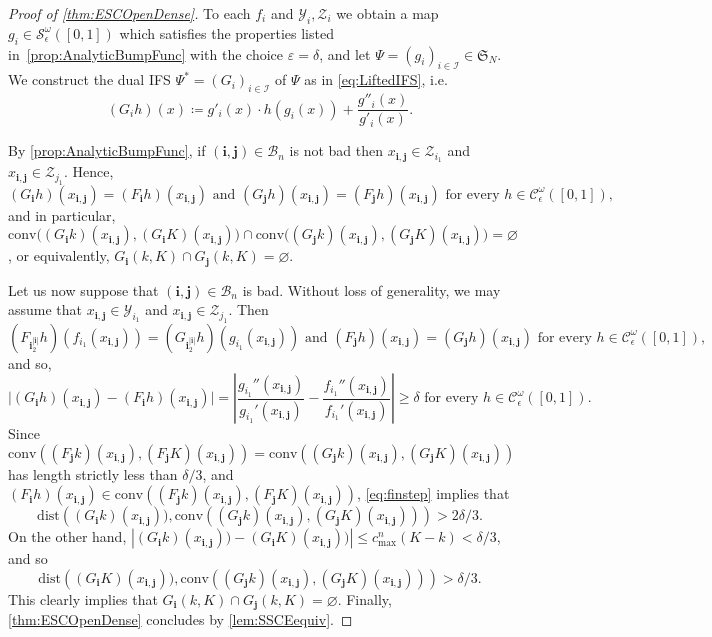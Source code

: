 \documentclass[12pt,]{article}
\def\cref#1{\ref{#1}}%
\theoremstyle{definition}
\theoremstyle{remark}
\newcommand{\0}{\mathbf{0}}
\newcommand{\bi}{\mathbf{i}}
\newcommand{\bj}{\mathbf{j}}
\begin{document}
\begin{proof}[Proof of \cref{thm:ESCOpenDense}]
To each $f_i$ and $\mathcal{Y}_i, \mathcal{Z}_i$ we obtain a map $g_i\in\mathcal{S}_\epsilon^\omega([0,1])$ which satisfies the properties
listed in~\cref{prop:AnalyticBumpFunc} with the choice $\varepsilon=\delta$, and let $\Psi=(g_i)_{i\in\mathcal{I}}\in\mathfrak{S}_N$. We construct the dual IFS $\Psi^*=(G_i)_{i\in\mathcal{I}}$ of $\Psi$ as in \cref{eq:LiftedIFS}, i.e. 
\begin{equation*}
(G_ih)(x)\coloneqq g'_i(x)\cdot h(g_i(x)) + \frac{g''_i(x)}{g'_i(x)}.
\end{equation*}

By \cref{prop:AnalyticBumpFunc}, if $(\bi,\bj)\in\mathcal{B}_n$ is not bad then $x_{\bi,\bj}\in\mathcal{Z}_{i_1}$ and $x_{\bi,\bj}\in\mathcal{Z}_{j_1}$. Hence,
\begin{equation*}
(G_{\bi}h)(x_{\bi,\bj})=(F_{\bi}h)(x_{\bi,\bj}) \text{ and } (G_{\bj}h)(x_{\bi,\bj})=(F_{\bj}h)(x_{\bi,\bj})\text{ for every }h\in\mathcal{C}_\epsilon^\omega([0,1]),
\end{equation*}
and in particular, $\mathrm{conv}\big((G_{\bi}k)(x_{\bi,\bj}), (G_{\bi}K)(x_{\bi,\bj})\big) \cap \mathrm{conv}\big((G_{\bj}k)(x_{\bi,\bj}),
(G_{\bj}K)(x_{\bi,\bj})\big)=\varnothing$, or equivalently, $G_{\bi}(k,K)\cap G_{\bj}(k,K)=\varnothing$.

Let us now suppose that $(\bi,\bj)\in\mathcal{B}_n$ is bad. Without loss of generality, we may assume that $x_{\bi,\bj}\in\mathcal{Y}_{i_1}$ and $x_{\bi,\bj}\in\mathcal{Z}_{j_1}$. Then
\begin{equation*}
	(F_{\bi_2^{|\bi|}}h)(f_{i_1}(x_{\bi,\bj}))=(G_{\bi_2^{|\bi|}}h)(g_{i_1}(x_{\bi,\bj})) \text{ and } (F_{\bj}h)(x_{\bi,\bj})=(G_{\bj}h)(x_{\bi,\bj})\text{ for every }h\in\mathcal{C}_\epsilon^\omega([0,1]),
\end{equation*}
and so,
\begin{equation}\label{eq:finstep}
\big|(G_{\bi}h)(x_{\bi,\bj})-(F_{\bi}h)(x_{\bi,\bj})\big| = \left|
\frac{g_{i_1}''(x_{\bi,\bj})}{g_{i_1}'(x_{\bi,\bj})} -
\frac{f_{i_1}''(x_{\bi,\bj})}{f_{i_1}'(x_{\bi,\bj})} \right|\geq \delta\text{ for every }h\in\mathcal{C}_\epsilon^\omega([0,1]).
\end{equation}
Since $\mathrm{conv}\left((F_{\bj}k)(x_{\bi,\bj}),(F_{\bj}K)(x_{\bi,\bj})\right)=\mathrm{conv}\left((G_{\bj}k)(x_{\bi,\bj}),(G_{\bj}K)(x_{\bi,\bj})\right)$ has length strictly less than $\delta/3$, and $(F_{\bi}h)(x_{\bi,\bj})\in\mathrm{conv}\left((F_{\bj}k)(x_{\bi,\bj}),(F_{\bj}K)(x_{\bi,\bj})\right)$, \cref{eq:finstep} implies that 
$$
\mathrm{dist}\left((G_{\bi}k)(x_{\bi,\bj})),\mathrm{conv}\left((G_{\bj}k)(x_{\bi,\bj}),(G_{\bj}K)(x_{\bi,\bj})\right)\right)>2\delta/3. 
$$
On the other hand, $|(G_{\bi}k)(x_{\bi,\bj}))-(G_{\bi}K)(x_{\bi,\bj}))|\leq c_{\max}^n(K-k)<\delta/3$, and so 
$$
\mathrm{dist}\left((G_{\bi}K)(x_{\bi,\bj})),\mathrm{conv}\left((G_{\bj}k)(x_{\bi,\bj}),(G_{\bj}K)(x_{\bi,\bj})\right)\right)>\delta/3. 
$$
This clearly implies that  $G_{\bi}(k,K)\cap G_{\bj}(k,K)=\varnothing$. Finally, \cref{thm:ESCOpenDense} concludes by \cref{lem:SSCEequiv}.   
\end{proof}
\end{document}
